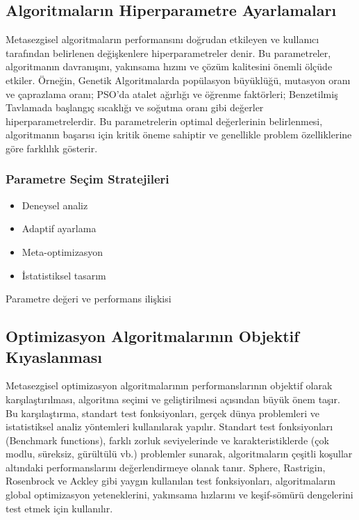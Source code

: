 \subsection{Algoritmaların Hiperparametre Ayarlamaları}
Metasezgisel algoritmaların performansını doğrudan etkileyen ve kullanıcı tarafından belirlenen değişkenlere hiperparametreler denir. Bu parametreler, algoritmanın davranışını, yakınsama hızını ve çözüm kalitesini önemli ölçüde etkiler. Örneğin, Genetik Algoritmalarda popülasyon büyüklüğü, mutasyon oranı ve çaprazlama oranı; PSO'da atalet ağırlığı ve öğrenme faktörleri; Benzetilmiş Tavlamada başlangıç sıcaklığı ve soğutma oranı gibi değerler hiperparametrelerdir. Bu parametrelerin optimal değerlerinin belirlenmesi, algoritmanın başarısı için kritik öneme sahiptir ve genellikle problem özelliklerine göre farklılık gösterir.

\subsubsection{Parametre Seçim Stratejileri}
\begin{itemize}
    \item Deneysel analiz
    \item Adaptif ayarlama
    \item Meta-optimizasyon
    \item İstatistiksel tasarım
\end{itemize}

\begin{marginfigure}
\centering
{}
\caption{Parametre değeri ve performans ilişkisi}
\label{fig:parameter_performance}
\end{marginfigure}

\subsection{Optimizasyon Algoritmalarının Objektif Kıyaslanması}
Metasezgisel optimizasyon algoritmalarının performanslarının objektif olarak karşılaştırılması, algoritma seçimi ve geliştirilmesi açısından büyük önem taşır. Bu karşılaştırma, standart test fonksiyonları, gerçek dünya problemleri ve istatistiksel analiz yöntemleri kullanılarak yapılır. Standart test fonksiyonları (Benchmark functions), farklı zorluk seviyelerinde ve karakteristiklerde (çok modlu, süreksiz, gürültülü vb.) problemler sunarak, algoritmaların çeşitli koşullar altındaki performanslarını değerlendirmeye olanak tanır. Sphere, Rastrigin, Rosenbrock ve Ackley gibi yaygın kullanılan test fonksiyonları, algoritmaların global optimizasyon yeteneklerini, yakınsama hızlarını ve keşif-sömürü dengelerini test etmek için kullanılır.

